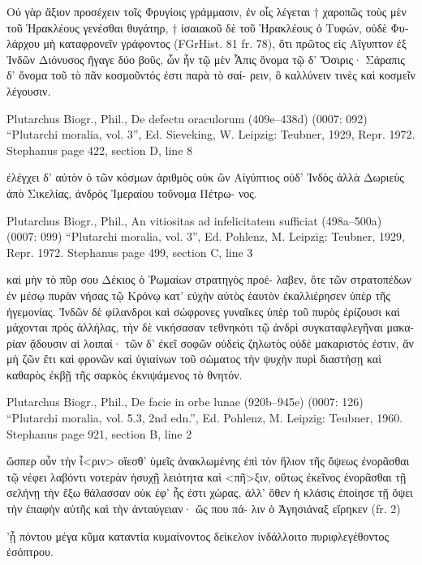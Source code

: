 \documentclass[12pt,letterpaper,twoside,final]{memoir}
\begin{document}
\begin{greek}
Οὐ γὰρ ἄξιον προσέχειν τοῖς Φρυγίοις γράμμασιν, ἐν 
οἷς λέγεται † χαροπῶς τοὺς μὲν τοῦ Ἡρακλέους γενέσθαι 
θυγάτηρ, † ἰσαιακοῦ δὲ τοῦ Ἡρακλέους ὁ Τυφών, οὐδὲ 
Φυλάρχου μὴ καταφρονεῖν γράφοντος (FGrHist. 81 fr. 78), 
ὅτι πρῶτος εἰς Αἴγυπτον ἐξ Ἰνδῶν Διόνυσος ἤγαγε δύο 
βοῦς, ὧν ἦν τῷ μὲν Ἆπις ὄνομα τῷ δ' Ὄσιρις· Σάραπις 
δ' ὄνομα τοῦ τὸ πᾶν κοσμοῦντός ἐστι παρὰ τὸ σαί-
ρειν, ὃ καλλύνειν τινὲς καὶ κοσμεῖν λέγουσιν. 



Plutarchus Biogr., Phil., De defectu oraculorum (409e–438d) (0007: 092)
“Plutarchi moralia, vol. 3”, Ed. Sieveking, W.
Leipzig: Teubner, 1929, Repr. 1972.
Stephanus page 422, section D, line 8

                                 ἐλέγχει δ' αὐτὸν ὁ τῶν 
κόσμων ἀριθμὸς οὐκ ὢν Αἰγύπτιος οὐδ' Ἰνδὸς ἀλλὰ 
Δωριεὺς ἀπὸ Σικελίας, ἀνδρὸς Ἱμεραίου τοὔνομα Πέτρω-
νος. 



Plutarchus Biogr., Phil., An vitiositas ad infelicitatem sufficiat (498a–500a) (0007: 099)
“Plutarchi moralia, vol. 3”, Ed. Pohlenz, M.
Leipzig: Teubner, 1929, Repr. 1972.
Stephanus page 499, section C, line 3

καὶ μὴν τὸ πῦρ σου Δέκιος ὁ Ῥωμαίων στρατηγὸς προέ-
λαβεν, ὅτε τῶν στρατοπέδων ἐν μέσῳ πυρὰν νήσας τῷ 
Κρόνῳ κατ' εὐχὴν αὐτὸς ἑαυτὸν ἐκαλλιέρησεν ὑπὲρ τῆς 
ἡγεμονίας. Ἰνδῶν δὲ φίλανδροι καὶ σώφρονες γυναῖκες 
ὑπὲρ τοῦ πυρὸς ἐρίζουσι καὶ μάχονται πρὸς ἀλλήλας, τὴν 
δὲ νικήσασαν τεθνηκότι τῷ ἀνδρὶ συγκαταφλεγῆναι μακα-
ρίαν ᾄδουσιν αἱ λοιπαί· τῶν δ' ἐκεῖ σοφῶν οὐδεὶς ζηλωτὸς 
οὐδὲ μακαριστός ἐστιν, ἂν μὴ ζῶν ἔτι καὶ φρονῶν καὶ 
ὑγιαίνων τοῦ σώματος τὴν ψυχὴν πυρὶ διαστήσῃ καὶ 
καθαρὸς ἐκβῇ τῆς σαρκὸς ἐκνιψάμενος τὸ θνητόν. 



Plutarchus Biogr., Phil., De facie in orbe lunae (920b–945e) (0007: 126)
“Plutarchi moralia, vol. 5.3, 2nd edn.”, Ed. Pohlenz, M.
Leipzig: Teubner, 1960.
Stephanus page 921, section B, line 2

                         ὥσπερ οὖν τὴν ἶ<ριν> οἴεσθ' 
ὑμεῖς ἀνακλωμένης ἐπὶ τὸν ἥλιον τῆς ὄψεως ἐνορᾶσθαι 
τῷ νέφει λαβόντι νοτερὰν ἡσυχῇ λειότητα καὶ <πῆ>ξιν, 
οὕτως ἐκεῖνος ἐνορᾶσθαι τῇ σελήνῃ τὴν ἔξω θάλασσαν 
οὐκ ἐφ' ἧς ἐστι χώρας, ἀλλ' ὅθεν ἡ κλάσις ἐποίησε τῇ 
ὄψει τὴν ἐπαφὴν αὐτῆς καὶ τὴν ἀνταύγειαν· ὥς που πά-
λιν ὁ Ἀγησιάναξ εἴρηκεν (fr. 2) 
       
 ’ᾗ πόντου μέγα κῦμα καταντία κυμαίνοντος 
 δείκελον ἰνδάλλοιτο πυριφλεγέθοντος ἐσόπτρου. 




\end{greek}
\end{document}
